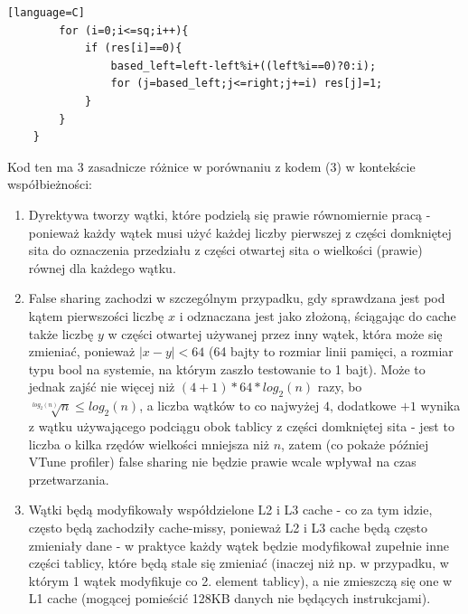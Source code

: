\documentclass[12pt]{article}
\begin{document}
\begin {enumerate}
\begin{lstlisting}[style=mystyle, caption= Sito funkcyjne z dynamic schedulingiem][language=C]
		for (i=0;i<=sq;i++){
			if (res[i]==0){
				based_left=left-left%i+((left%i==0)?0:i);
				for (j=based_left;j<=right;j+=i) res[j]=1;
			}
		}
	}
	\end{lstlisting}
	Kod ten ma 3 zasadnicze różnice w porównaniu z kodem (3) w kontekście współbieżności:
	\begin{enumerate}
		\item Dyrektywa tworzy wątki, które podzielą się prawie równomiernie pracą - ponieważ każdy wątek musi użyć każdej liczby pierwszej z części domkniętej sita do oznaczenia przedziału z części otwartej sita o wielkości (prawie) równej dla każdego wątku.
		\item False sharing zachodzi w szczególnym przypadku, gdy sprawdzana jest pod kątem pierwszości liczbę \(x\) i odznaczana jest jako złożoną, ściągając do cache także liczbę \(y\) w części otwartej używanej przez inny wątek, która może się zmieniać, ponieważ \(|x-y|<64\) (64 bajty to rozmiar linii pamięci, a rozmiar typu bool na systemie, na którym zaszło testowanie to 1 bajt). Może to jednak zajść nie więcej niż \((4+1)*64*log_2(n)\) razy, bo \(\sqrt[log_2(n)]{n}\le log_2(n)\), a liczba wątków to co najwyżej \(4\), dodatkowe \(+1\) wynika z wątku używającego podciągu obok tablicy z części domkniętej sita - jest to liczba o kilka rzędów wielkości mniejsza niż \(n\), zatem (co pokaże później VTune profiler) false sharing nie będzie prawie wcale wpływał na czas przetwarzania.
		\item Wątki będą modyfikowały współdzielone L2 i L3 cache - co za tym idzie, często będą zachodziły cache-missy, ponieważ L2 i L3 cache będą często zmieniały dane - w praktyce każdy wątek będzie modyfikował zupełnie inne części tablicy, które będą stale się zmieniać (inaczej niż np. w przypadku, w którym 1 wątek modyfikuje co 2. element tablicy), a nie zmieszczą się one w L1 cache (mogącej pomieścić 128KB danych nie będących instrukcjami).
	\end{enumerate}


\end{enumerate}
\end{document}
